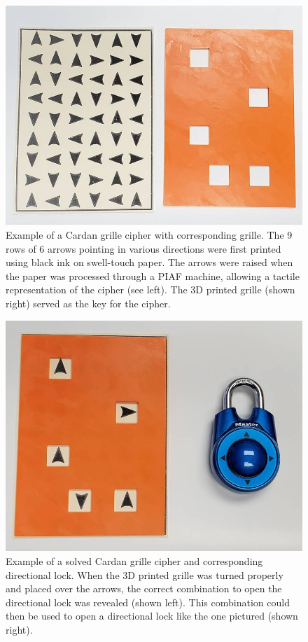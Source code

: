 \documentclass[11.5pt]{sig-alternate} %
\begin{document}
\begin{large}
\begin{figure}[ht]
    \centering
    \includegraphics[width=1\linewidth]{1117_Fig3.jpg}
    \caption{Example of a Cardan grille cipher with corresponding grille. The 9 rows of 6 arrows pointing in various directions were first printed using black ink on swell-touch paper. The arrows were raised when the paper was processed through a PIAF machine, allowing a tactile representation of the cipher (see left). The 3D printed grille (shown right) served as the key for the cipher.}
\end{figure}

\begin{figure}[ht]
    \centering
    \includegraphics[width=1\linewidth]{1117_Fig4.jpg}
    \caption{Example of a solved Cardan grille cipher and corresponding directional lock. When the 3D printed grille was turned properly and placed over the arrows, the correct combination to open the directional lock was revealed (shown left). This combination could then be used to open a directional lock like the one pictured (shown right).}
\end{figure}


\end{large}
\end{document}
